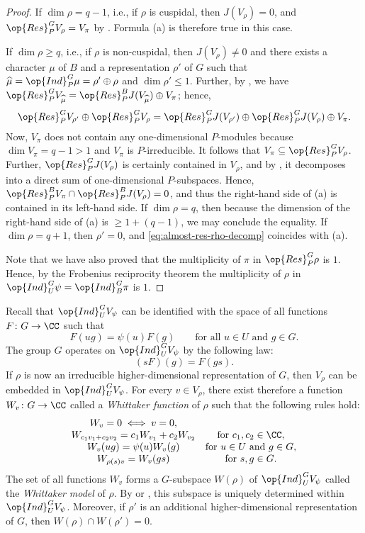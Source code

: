 \documentclass[../main.tex]{subfiles}
\begin{document}
\begin{proof}
	If $\dim\rho=q-1$, i.e., if $\rho$ is cuspidal, then $J(V_\rho)=0$, and $\op{Res}^G_PV_\rho=V_\pi$ by . Formula (a) is therefore true in this case.

	If $\dim\rho\ge q$, i.e., if $\rho$ is non-cuspidal, then $J(V_\rho)\ne0$ and there exists a character $\mu$ of $B$ and a representation $\rho'$ of $G$ such that $\widehat\mu=\op{Ind}^G_P\mu=\rho'\oplus\rho$ and $\dim\rho'\le1$. Further, by , we have $\op{Res}^G_PV_{\widehat\mu}=\op{Res}^B_PJ(V_{\widehat\mu})\oplus V_\pi$; hence,
	\begin{equation}
		\op{Res}^G_PV_{\rho'}\oplus\op{Res}^G_PV_\rho=\op{Res}^G_PJ(V_{\rho'})\oplus\op{Res}^G_PJ(V_\rho)\oplus V_\pi. \label{eq:almost-res-rho-decomp}
	\end{equation}
	Now, $V_\pi$ does not contain any one-dimensional $P$-modules because $\dim V_\pi=q-1>1$ and $V_\pi$ is $P$-irreducible. It follows that $V_\pi\subseteq\op{Res}^G_PV_\rho$. Further, $\op{Res}^G_PJ(V_\rho)$ is certainly contained in $V_\rho$, and by , it decomposes into a direct sum of one-dimensional $P$-subspaces. Hence, $\op{Res}^B_PV_\pi\cap\op{Res}^B_PJ(V_\rho)=0$, and thus the right-hand side of (a) is contained in its left-hand side. If $\dim\rho=q$, then because the dimension of the right-hand side of (a) is $\ge1+(q-1)$, we may conclude the equality. If $\dim\rho=q+1$, then $\rho'=0$, and \eqref{eq:almost-res-rho-decomp} coincides with (a).

	Note that we have also proved that the multiplicity of $\pi$ in $\op{Res}^G_P\rho$ is $1$. Hence, by the Frobenius reciprocity theorem the multiplicity of $\rho$ in $\op{Ind}^G_U\psi=\op{Ind}^G_B\pi$ is $1$.
\end{proof}

Recall that $\op{Ind}^G_UV_\psi$ can be identified with the space of all functions $F\colon G\to\CC$ such that
\[F(ug)=\psi(u)F(g)\qquad\text{for all }u\in U\text{ and }g\in G.\]
The group $G$ operates on $\op{Ind}^G_UV_\psi$ by the following law:
\[(sF)(g)=F(gs).\]
If $\rho$ is now an irreducible higher-dimensional representation of $G$, then $V_\rho$ can be embedded in $\op{Ind}^G_UV_\psi$. For every $v\in V_\rho$, there exist therefore a function $W_v\colon G\to\CC$ called a \textit{Whittaker function} of $\rho$ such that the following rules hold:
\[\begin{array}{cc}
	W_v=0\iff v=0, \\
	W_{c_1v_1+c_2v_2}=c_1W_{v_1}+c_2W_{v_2} & \text{for }c_1,c_2\in\CC, \\
	W_v(ug)=\psi(u)W_v(g) & \text{for }u\in U\text{ and }g\in G, \\
	W_{\rho(s)v}=W_v(gs) & \text{for }s,g\in G.
\end{array}\]
The set of all functions $W_v$ forms a $G$-subspace $W(\rho)$ of $\op{Ind}^G_UV_\psi$ called the \textit{Whittaker model} of $\rho$. By  or , this subspace is uniquely determined within $\op{Ind}^G_UV_\psi$. Moreover, if $\rho'$ is an additional higher-dimensional representation of $G$, then $W(\rho)\cap W(\rho')=0$.
\end{document}
